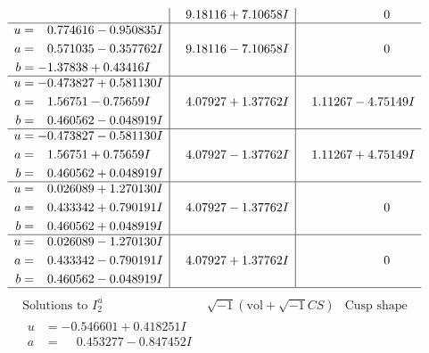 \documentclass[1p]{elsarticle_modified}
\theoremstyle{definition}
\newcommand{\I}{\sqrt{-1}}
\begin{document}
$$\begin{array}{c|c|c}
 & \phantom{-}9.18116 + 7.10658 I & \phantom{-0.000000 } 0 \\ \hline\begin{aligned}
u &= \phantom{-}0.774616 - 0.950835 I \\
a &= \phantom{-}0.571035 - 0.357762 I \\
b &= -1.37838 + 0.43416 I\end{aligned}
 & \phantom{-}9.18116 - 7.10658 I & \phantom{-0.000000 } 0 \\ \hline\begin{aligned}
u &= -0.473827 + 0.581130 I \\
a &= \phantom{-}1.56751 - 0.75659 I \\
b &= \phantom{-}0.460562 - 0.048919 I\end{aligned}
 & \phantom{-}4.07927 + 1.37762 I & \phantom{-}1.11267 - 4.75149 I \\ \hline\begin{aligned}
u &= -0.473827 - 0.581130 I \\
a &= \phantom{-}1.56751 + 0.75659 I \\
b &= \phantom{-}0.460562 + 0.048919 I\end{aligned}
 & \phantom{-}4.07927 - 1.37762 I & \phantom{-}1.11267 + 4.75149 I \\ \hline\begin{aligned}
u &= \phantom{-}0.026089 + 1.270130 I \\
a &= \phantom{-}0.433342 + 0.790191 I \\
b &= \phantom{-}0.460562 + 0.048919 I\end{aligned}
 & \phantom{-}4.07927 - 1.37762 I & \phantom{-0.000000 } 0 \\ \hline\begin{aligned}
u &= \phantom{-}0.026089 - 1.270130 I \\
a &= \phantom{-}0.433342 - 0.790191 I \\
b &= \phantom{-}0.460562 - 0.048919 I\end{aligned}
 & \phantom{-}4.07927 + 1.37762 I & \phantom{-0.000000 } 0\\
 \hline 
 \end{array}$$\newpage$$\begin{array}{c|c|c}  
\text{Solutions to }I^u_{2}& \I (\text{vol} + \sqrt{-1}CS) & \text{Cusp shape}\\
 \hline 
\begin{aligned}
u &= -0.546601 + 0.418251 I \\
a &= \phantom{-}0.453277 - 0.847452 I \\

\end{aligned}
\end{array}$$
\end{document}
